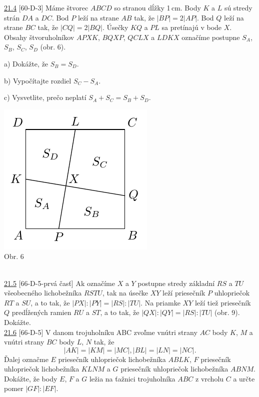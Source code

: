 \noindent \ul{21.4} [60-D-3]  Máme štvorec $ABCD$ so stranou dĺžky 1\,cm. Body $K$ a $L$ sú stredy strán $DA$ a $DC$. Bod $P$ leží na strane $AB$ tak, že $| BP | = 2 | AP |$. Bod $Q$ leží na strane $BC$ tak, že $| CQ | = 2 | BQ |$. Úsečky $KQ$ a $PL$ sa pretínajú v bode $X$. Obsahy štvoruholníkov $APXK$, $BQXP$, $QCLX$ a $LDKX$ označíme postupne $S_A$, $S_B$, $S_C$, $S_D$ (obr. 6).

a) Dokážte, že $S_B = S_D$.

b) Vypočítajte rozdiel $S_C - S_A$.

c) Vysvetlite, prečo neplatí $S_A + S_C = S_B + S_D$.
\begin{center}
\includegraphics{obrazky/60D31}\\

Obr. 6
\end{center}\\

\noindent \ul{21.5} [66-D-5-prvá časť] Ak označíme $X$ a $Y$ postupne stredy základní $RS$ a $TU$ všeobecného lichobežníka $RSTU$, tak na úsečke $XY$ leží priesečník $P$ uhlopriečok $RT$ a $SU$, a to tak, že $|PX| : |PY | = |RS| : |TU|$. Na priamke $XY$ leží tiež priesečník $Q$ predĺžených ramien $RU$ a $ST$, a to tak, že $|QX| : |QY | = |RS| : |TU|$ (obr. 9). Dokážte.\\

\noindent \ul{21.6} [66-D-5] V danom trojuholníku ABC zvoľme vnútri strany $AC$ body $K$, $M$ a vnútri strany $BC$ body $L$, $N$ tak, že
$$|AK| = |KM| = |MC|, |BL| = |LN| = |NC|.$$
Ďalej označme $E$ priesečník uhlopriečok lichobežníka $ABLK$, $F$ priesečník uhlopriečok lichobežníka $KLNM$ a $G$ priesečník uhlopriečok lichobežníka $ABNM$. Dokážte, že body $E$, $F$ a $G$ ležia na ťažnici trojuholníka $ABC$ z vrcholu $C$ a určte pomer $|GF| : |EF|$.\\

